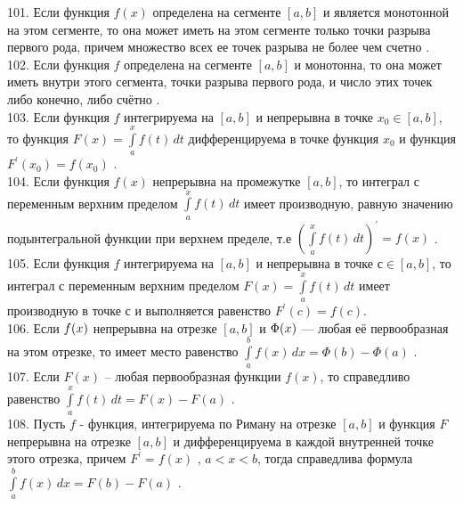 \documentclass[12pt]{article}
\begin{document}
101. Если функция ${\displaystyle f(x)}$ определена на сегменте ${\displaystyle [a,b]}$ и является монотонной на этом сегменте, то она может иметь на этом сегменте только точки разрыва первого рода, причем множество всех ее точек разрыва не более чем счетно .\\

102. Если функция ${\displaystyle f}$  определена на сегменте  ${\displaystyle \left [ a,b \right ]}$ и монотонна, то она может иметь внутри этого сегмента, точки разрыва первого рода, и число этих точек либо конечно, либо счётно .\\

103. Если функция ${\displaystyle f}$ интегрируема на ${\displaystyle [a,b]}$ и непрерывна в точке ${\displaystyle x_0 \in [a,b]}$, то функция ${\displaystyle F(x)=\int \limits _{a}^{x} f(t)\,dt}$  дифференцируема в точке функция ${\displaystyle x_0}$ и функция ${\displaystyle F^{\prime}(x_0)=f(x_0)}$ .\\

104. Если функция ${\displaystyle f(x)}$ непрерывна на промежутке ${\displaystyle [a,b]}$, то интеграл с переменным верхним пределом  ${\displaystyle \int \limits _{a}^{x} f(t)\,dt}$ имеет производную, равную значению подынтегральной функции при верхнем пределе, т.е ${\displaystyle \left (\int \limits _{a}^{x} f(t)\,dt\right )^{\prime}=f(x)}$ .\\

105. Если функция ${\displaystyle f}$ интегрируема на ${\displaystyle [a,b]}$ и непрерывна в точке ${\displaystyle с \in [a,b]}$, то интеграл с переменным верхним пределом ${\displaystyle F(x)=\int \limits _{a}^{x} f(t)\,dt}$ имеет производную в точке ${\displaystyle с}$ и выполняется равенство ${\displaystyle F^{\prime}(c)=f(c)}$.\\

106. Если ${\displaystyle \textstyle f(x)}$ непрерывна на отрезке ${\displaystyle \left [a,b\right ]}$  и ${\displaystyle \textstyle \Phi (x)}$ — любая её первообразная на этом отрезке, то имеет место равенство ${\displaystyle \int \limits _a^b f(x)\,dx=\Phi (b)-\Phi (a)}$ .\\

107. Если  ${\displaystyle F(x)}$ – любая первообразная функции ${\displaystyle f(x)}$,  то справедливо равенство ${\displaystyle \int \limits _a^x f(t)\,dt=F(x)-F(a)}$ .\\

108. Пусть ${\displaystyle f}$ - функция, интегрируема по Риману на отрезке ${\displaystyle [a,b]}$ и функция ${\displaystyle F}$ непрерывна на отрезке ${\displaystyle [a,b]}$ и дифференцируема в каждой внутренней точке этого отрезка, причем ${\displaystyle F^{\prime}=f(x)}$ , ${\displaystyle a<x<b}$, тогда справедлива формула ${\displaystyle \int \limits _{a}^{b} f(x)\,dx=F(b)-F(a)}$ .\\
\end{document}
